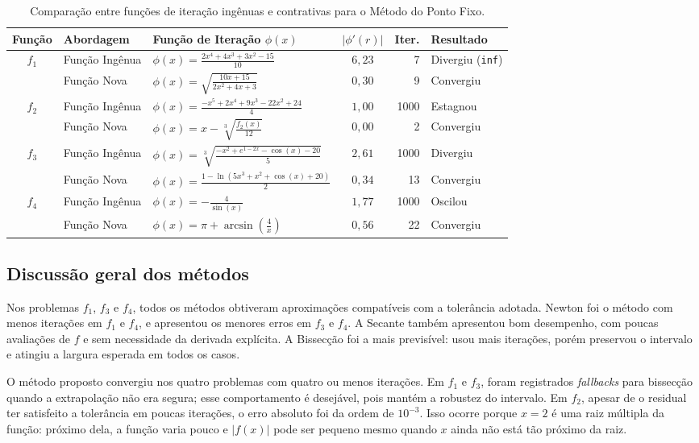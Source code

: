 \documentclass[12pt,a4paper]{article}
\begin{document}
\begin{table}[H]
\centering
\caption{Comparação entre funções de iteração ingênuas e contrativas para o Método do Ponto Fixo.}
\label{tab:ponto_fixo_comparativo}
\small
\begin{tabular}{c l l c r l}
\toprule
Função & Abordagem & Função de Iteração $\phi(x)$ & $|\phi'(r)|$ & Iter. & Resultado \\
\midrule
$f_1$ & Função Ingênua & $\phi(x) = \frac{2x^4 + 4x^3 + 3x^2 - 15}{10}$ & $6{,}23$ & 7 & Divergiu (\texttt{inf}) \\
& Função Nova & $\phi(x) = \sqrt{\frac{10x + 15}{2x^2 + 4x + 3}}$ & $0{,}30$ & 9 & Convergiu \\
\midrule
$f_2$ & Função Ingênua & $\phi(x) = \frac{-x^5 + 2x^4 + 9x^3 - 22x^2 + 24}{4}$ & $1{,}00$ & 1000 & Estagnou \\
& Função Nova & $\phi(x) = x - \sqrt[3]{\frac{f_2(x)}{12}}$ & $0{,}00$ & 2 & Convergiu \\
\midrule
$f_3$ & Função Ingênua & $\phi(x) = \sqrt[3]{\frac{-x^2 + e^{1-2x} - \cos(x) - 20}{5}}$ & $2{,}61$ & 1000 & Divergiu \\
& Função Nova & $\phi(x) = \frac{1 - \ln(5x^3 + x^2 + \cos(x) + 20)}{2}$ & $0{,}34$ & 13 & Convergiu \\
\midrule
$f_4$ & Função Ingênua & $\phi(x) = -\frac{4}{\sin(x)}$ & $1{,}77$ & 1000 & Oscilou \\
& Função Nova & $\phi(x) = \pi + \arcsin\left(\frac{4}{x}\right)$ & $0{,}56$ & 22 & Convergiu \\
\bottomrule
\end{tabular}
\end{table}

\subsection{Discussão geral dos métodos}

Nos problemas $f_1$, $f_3$ e $f_4$, todos os métodos obtiveram aproximações compatíveis com a tolerância adotada. Newton foi o método com menos iterações em $f_1$ e $f_4$, e apresentou os menores erros em $f_3$ e $f_4$. A Secante também apresentou bom desempenho, com poucas avaliações de $f$ e sem necessidade da derivada explícita. A Bissecção foi a mais previsível: usou mais iterações, porém preservou o intervalo e atingiu a largura esperada em todos os casos.

O método proposto convergiu nos quatro problemas com quatro ou menos iterações. Em $f_1$ e $f_3$, foram registrados \textit{fallbacks} para bissecção quando a extrapolação não era segura; esse comportamento é desejável, pois mantém a robustez do intervalo. Em $f_2$, apesar de o residual ter satisfeito a tolerância em poucas iterações, o erro absoluto foi da ordem de $10^{-3}$. Isso ocorre porque $x=2$ é uma raiz múltipla da função: próximo dela, a função varia pouco e $|f(x)|$ pode ser pequeno mesmo quando $x$ ainda não está tão próximo da raiz.
\end{document}
